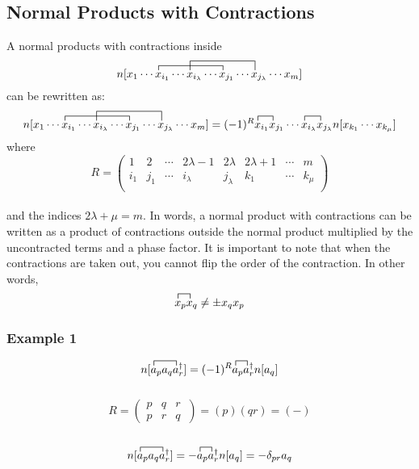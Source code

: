 \documentclass{article}
\newcommand{\dg}{\ensuremath{^\dagger} }
\newcommand{\cd}{\ensuremath{\cdots} }
\begin{document}
\subsection{Normal Products with Contractions}
A normal products with contractions inside
\[ 
\contraction{n[x_1 \cd }{x}{{}_{i_1} \cd x_{i_\lambda} \cd }{x}
\contraction[2ex]{n[x_1 \cd x_{i_1} \cd}{ x}{{}_{i_\lambda} \cd x_{j_1} \cd }{x} 
n[x_1 \cd x_{i_1} \cd x_{i_\lambda} \cd x_{j_1} \cd x_{j_\lambda} \cd x_m] 
\] 
can be rewritten as: 
\[ 
\contraction{n[x_1 \cd }{x}{{}_{i_1} \cd x_{i_\lambda} \cd }{x}
\contraction[2ex]{n[x_1 \cd x_{i_1} \cd}{ x}{{}_{i_\lambda} \cd x_{j_1} \cd }{x} 
n[x_1 \cd x_{i_1} \cd x_{i_\lambda} \cd x_{j_1} \cd x_{j_\lambda} \cd x_m] 
= 
\contraction{(-1)^R}{x}{{}_{i_1} }{x}
\contraction{(-1)^R x_{i_1}x_{j_1} \cd}{x}{{}_{i_\lambda} }{x}
(-1)^R x_{i_1}x_{j_1} \cd x_{i_\lambda} x_{j_\lambda} n[x_{k_1} \cd x_{k_\mu}]
\] 
where 
\[
R = 
\begin{pmatrix}
1 & 2 & \cd & 2\lambda -1 & 2\lambda & 2\lambda + 1&\cd & m  \\
i_1 & j_1 & \cd& i_\lambda & j_\lambda  &k_1 & \cd & k_\mu \\
\end{pmatrix}
\] \\
and the indices $2\lambda + \mu = m$.
In words, a normal product with contractions can be written as a product of contractions outside the normal product multiplied by the uncontracted terms and a phase factor. 
It is important to note that when the contractions are taken out, you cannot flip the order of the contraction.
In other words, 
\[ \contraction{}{x}{{}_p}{x}
x_p x_q \neq \pm x_q x_p  \]
\subsubsection{Example 1}
\[\contraction{n[}{a}{{}_p a_q }{a}
\contraction{n[a_p a_q a_r\dg] = (-)^R a}{a}{_p}{a}
n[a_p a_q a_r\dg] = (-1)^R a_p a_r\dg n[a_q] \] \\
\[
R = 
\begin{pmatrix}
p & q & r  \\
p & r& q\
\end{pmatrix}
= (p)(qr) = (-)
\] \\
\[\contraction{n[}{a}{{}_p a_q }{a}
\contraction{n[a_p a_q a_r\dg] = -}{a}{{}_p}{a}
n[a_p a_q a_r\dg] = - a_p a_r\dg n[a_q] = -\delta_{pr}a_q \]
\end{document}
